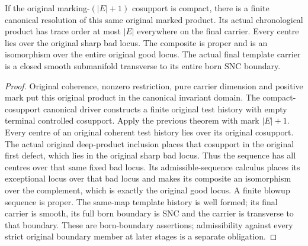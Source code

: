 \begin{theorem}
\label{hir:sharp-actual-finite-deep-product-phase}
If the original marking-$(|E|+1)$ cosupport is compact, there is a finite
canonical resolution of this same original marked product. Its actual
chronological product has trace order at most $|E|$ everywhere on the final
carrier. Every centre lies over the original sharp bad locus. The composite
is proper and is an isomorphism over the entire original good locus. The
actual final template carrier is a closed smooth submanifold transverse to
its entire born SNC boundary.
\end{theorem}
\begin{proof}
Original coherence, nonzero restriction, pure carrier dimension and positive
mark put this original product in the canonical invariant domain. The
compact-cosupport canonical driver constructs a finite original test history
with empty terminal controlled cosupport. Apply the previous theorem with
mark $|E|+1$. Every centre of an original coherent test history lies over its
original cosupport. The actual original deep-product inclusion places that
cosupport in the original first defect, which lies in the original sharp bad
locus. Thus the sequence has all centres over that same fixed bad locus.
Its admissible-sequence calculus places its exceptional locus over that bad
locus and makes its composite an isomorphism over the complement, which is
exactly the original good locus. A finite blowup sequence is proper.
The same-map template history is well formed; its final carrier is smooth,
its full born boundary is SNC and the carrier is transverse to that boundary.
These are born-boundary assertions; admissibility against every strict
original boundary member at later stages is a separate obligation.
\leanok
\end{proof}

